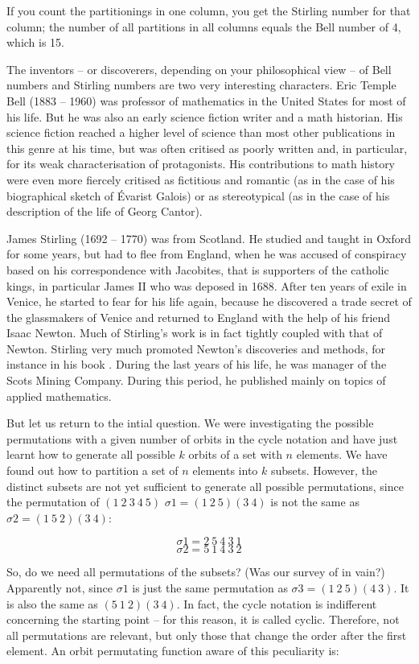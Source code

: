 \documentclass{scrreprt}
\begin{document}
If you count the partitionings in one column,
you get the Stirling number for that column;
the number of all partitions in all columns
equals the Bell number of 4, which is 15.

The inventors -- or discoverers, depending on 
your philosophical view -- of Bell numbers and Stirling numbers
are two very interesting characters.
Eric Temple Bell (1883 -- 1960) was professor of mathematics
in the United States for most of his life.
But he was also an early science fiction writer
and a math historian.
His science fiction reached a higher level of science
than most other publications in this genre at his time,
but was often critised as poorly written and, in particular,
for its weak characterisation of protagonists.
His contributions to math history were even more fiercely critised as
fictitious and romantic (as in the case of his biographical sketch
of Évarist Galois) or as stereotypical (as in the case
of his description of the life of Georg Cantor).

James Stirling (1692 -- 1770) was from Scotland.
He studied and taught in Oxford for some years, but had to
flee from England, when he was accused of conspiracy
based on his correspondence with Jacobites, 
that is supporters of the catholic kings, 
in particular James II who was deposed in 1688.
After ten years of exile in Venice,
he started to fear for his life again, because
he discovered a trade secret of the glassmakers of Venice
and returned to England with the help of his friend
Isaac Newton. Much of Stirling's work
is in fact tightly coupled with that of Newton.
Stirling very much promoted Newton's discoveries and methods,
for instance
in his book .
During the last years of his life,
he was manager of the Scots Mining Company.
During this period, he published mainly on topics
of applied mathematics.

But let us return to the intial question.
We were investigating the possible permutations
with a given number of orbits in the cycle notation
and have just learnt how to generate all possible $k$ orbits
of a set with $n$ elements.
We have found out how to partition 
a set of $n$ elements into $k$ subsets.
However, the distinct subsets are not yet sufficient
to generate all possible permutations,
since the permutation of $(1~2~3~4~5)$
$\sigma1 = (1~2~5) (3~4)$
is not the same as $\sigma2 = (1~5~2) (3~4)$:

\[
\sigma1 = 2~5~4~3~1
\]
\[
\sigma2 = 5~1~4~3~2
\]

So, do we need all permutations of the subsets?
(Was our survey of  in vain?)
Apparently not, since $\sigma1$ is just the same
permutation as $\sigma3 = (1~2~5) (4~3)$.
It is also the same as $(5~1~2) (3~4)$.
In fact, the cycle notation is indifferent
concerning the starting point -- for this reason, it is called cyclic.
Therefore, not all permutations are relevant,
but only those that change the order after the first element.
An orbit permutating function aware of this peculiarity is:
\end{document}
